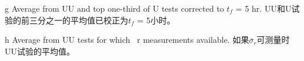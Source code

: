 \begin{sidewaystable}[p]
\begin{threeparttable}
\begin{tablenotes}
            \item[g] Average from UU and top one-third of U tests corrected to $t_f$ = 5 hr. UU和U试验的前三分之一的平均值已校正为$t_f$ = 5小时。
            \item[h] Average from UU tests for which ~r measurements available. 如果$\overline{\sigma}_r$可测量时UU试验的平均值。
        \end{tablenotes}
    \end{threeparttable}
    \label{table:4}%
\end{sidewaystable}

